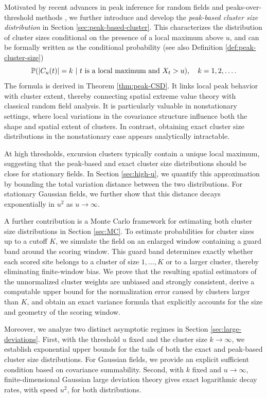 \documentclass[aap,preprint]{imsart}
\theoremstyle{plain}
\theoremstyle{definition}
\def\P{{\mathbb P}}
\begin{document}
	Motivated by recent advances in peak inference for random fields \citep{CS15,CS18,CS17} and peaks-over-threshold methods \citep{Fondeville:2018,Huser:2014}, we further introduce and develop the \textit{peak-based cluster size distribution} in Section \ref{sec:peak-based-cluster}. This characterizes the distribution of cluster sizes conditional on the presence of a local maximum above $u$, and can be formally written as the conditional probability (see also Definition \ref{def:peak-cluster-size})
	\[
	\P(|C_u(t)|=k \ | \ t \ \text{\rm is a local maximum and } X_t>u), \quad k=1,2,\ldots.
	\]
	The formula is derived in Theorem \ref{thm:peak-CSD}. It links local peak behavior with cluster extent, thereby connecting spatial extreme value theory with classical random field analysis. It is particularly valuable in nonstationary settings, where local variations in the covariance structure influence both the shape and spatial extent of clusters. In contrast, obtaining exact cluster size distributions in the nonstationary case appears analytically intractable. 
	
	At high thresholds, excursion clusters typically contain a unique local maximum, suggesting that the peak-based and exact cluster size distributions should be close for stationary fields. In Section \ref{sec:high-u}, we quantify this approximation by bounding the total variation distance between the two distributions. For stationary Gaussian fields, we further show that this distance decays exponentially in $u^2$ as $u\to\infty$.
	
	A further contribution is a Monte Carlo framework for estimating both cluster size distributions in Section \ref{sec:MC}. To estimate probabilities for cluster sizes up to a cutoff $K$, we simulate the field on an enlarged window containing a guard band around the scoring window. This guard band determines exactly whether each scored site belongs to a cluster of size $1,\ldots,K$ or to a larger cluster, thereby eliminating finite-window bias. We prove that the resulting spatial estimators of the unnormalized cluster weights are unbiased and strongly consistent, derive a computable upper bound for the normalization error caused by clusters larger than $K$, and obtain an exact variance formula that explicitly accounts for the size and geometry of the scoring window.
	
	Moreover, we analyze two distinct asymptotic regimes in Section \ref{sec:large-deviations}. First, with the threshold $u$ fixed and the cluster size $k\to \infty$, we establish exponential upper bounds for the tails of both the exact and peak-based cluster size distributions. For Gaussian fields, we provide an explicit sufficient condition based on covariance summability. Second, with $k$ fixed and $u\to\infty$, finite-dimensional Gaussian large deviation theory gives exact logarithmic decay rates, with speed $u^2$, for both distributions. 
	
\end{document}

